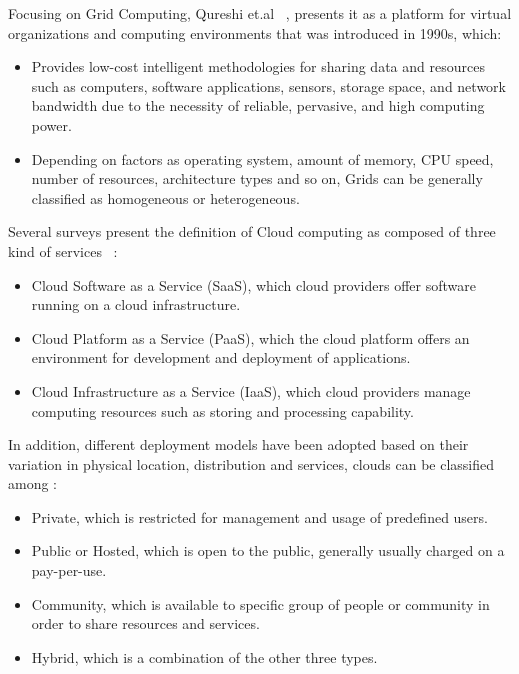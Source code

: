 Focusing on Grid Computing, Qureshi et.al ~\cite{survey_grid}, presents it as a platform for virtual organizations and computing environments that was introduced in 1990s, which:

\begin{itemize}

    \item  Provides low-cost intelligent methodologies for sharing data and resources such as computers, software applications, sensors, storage space, and network bandwidth due to the necessity of reliable, pervasive, and high computing power.
    
    \item  Depending on factors as operating system, amount of memory, CPU speed, number of resources, architecture types and so on, Grids can be generally classified as homogeneous or heterogeneous.
    
\end{itemize}

Several surveys present the definition of Cloud computing as composed of three kind of services ~\cite{survey_3, survey_2, survey_grid}:
\begin{itemize}

    \item Cloud Software as a Service (SaaS), which cloud providers offer software running on a cloud infrastructure.
    
    \item Cloud Platform as a Service (PaaS), which the cloud platform offers an environment for development and deployment of applications.
    
    \item Cloud Infrastructure as a Service (IaaS), which cloud providers manage computing resources such as storing and processing capability.
    
\end{itemize}

In addition, different deployment models have been adopted based on their variation in physical location, distribution and services, clouds can be classified among :
\begin{itemize}

    \item Private, which is restricted for management and usage of predefined users. 
    \item Public or Hosted, which is open to the public, generally usually charged on a pay-per-use. 
    \item Community, which is available to specific group of people or community in order to share resources and services. 
    \item Hybrid, which is a combination of the other three types.

\end{itemize}

